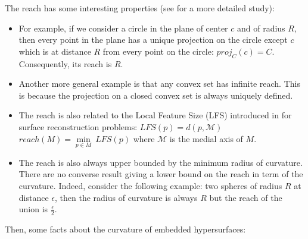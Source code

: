 The reach has some interesting properties (see \cite{merigot2009detection} for a
more detailed study):

\begin{itemize}
    \item For example, if we consider a circle in the plane of center $ c $ and
        of radius $ R $, then every point in the plane has a unique projection on
        the circle except $ c $ which is at distance $ R $ from every point on the
        circle: $ proj_C(c) = C $. Consequently, its reach is $ R $.

    \item Another more general example is that any convex set has infinite
        reach. This is because the projection on a closed convex set is always
        uniquely defined.

    \item The reach is also related to the Local Feature Size (LFS) introduced
        in \cite{amenta1999surface} for surface reconstruction problems: $
        LFS(p) = d(p, \mathcal{M}) $ $ reach(M) = \min\limits_{p \in M}~LFS(p) $
        where $ \mathcal{M}  $ is the medial axis of $ M $.

    \item The reach is also always upper bounded by the minimum radius of
        curvature. There are no converse result giving a lower bound on the
        reach in term of the curvature. Indeed, consider the
        following example: two spheres of radius $ R $ at distance $ \epsilon $,
        then the radius of curvature is always $ R $ but the reach of the union
        is $ \frac{\epsilon}{2} $.
\end{itemize}

Then, some facts about the curvature of embedded hypersurfaces:

